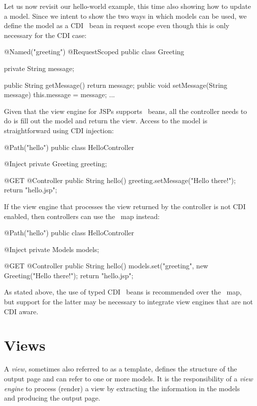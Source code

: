Let us now revisit our hello-world example, this time also showing how to update
a model. Since we intent to show the two ways in which models can be used, we define the
model as a CDI \Named\ bean in request scope even though this is only necessary
for the CDI case:

\begin{listing}{1}
@Named("greeting")
@RequestScoped
public class Greeting {

	private String message;
	
	public String getMessage() { return message; }
	public void setMessage(String message) { this.message = message; }
	...
}
\end{listing}

Given that the view engine for JSPs supports \Named\ beans, all the controller
needs to do is fill out the model and return the view. Access to the model
is straightforward using CDI injection:

\begin{listing}{1}
@Path("hello")
public class HelloController {

	@Inject
	private Greeting greeting;

    @GET
    @Controller
    public String hello() {
        greeting.setMessage("Hello there!");
        return "hello.jsp";
    }
}
\end{listing}

If the view engine that processes the view returned by the controller is not CDI 
enabled, then controllers can use the \Models\ map instead:

\begin{listing}{1}
@Path("hello")
public class HelloController {

	@Inject
	private Models models;

    @GET
    @Controller
    public String hello() {
        models.set("greeting", new Greeting("Hello there!");
        return "hello.jsp";
    }
}
\end{listing}

As stated above, the use of typed CDI \Named\ beans is recommended over the \Models\ map,
but support for the latter may be necessary to integrate view engines that are not
CDI aware.

\section{Views}
\label{views}

A {\em view}, sometimes also referred to as a template, defines the structure of the output
page and can refer to one or more models. It is the responsibility of a {\em view engine}
to process (render) a view by extracting the information in the models and producing the
output page. 


